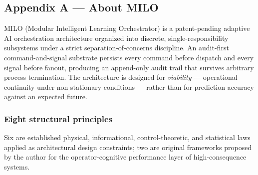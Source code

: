 \subsection{Appendix A --- About MILO}\label{appendix-a-about-milo}

MILO (Modular Intelligent Learning Orchestrator) is a patent-pending
adaptive AI orchestration architecture organized into discrete,
single-responsibility subsystems under a strict separation-of-concerns
discipline. An audit-first command-and-signal substrate persists every
command before dispatch and every signal before fanout, producing an
append-only audit trail that survives arbitrary process termination. The
architecture is designed for \emph{viability} --- operational continuity
under non-stationary conditions --- rather than for prediction accuracy
against an expected future.

\subsubsection{Eight structural
principles}\label{eight-structural-principles}

Six are established physical, informational, control-theoretic, and
statistical laws applied as architectural design constraints; two are
original frameworks proposed by the author for the operator-cognitive
performance layer of high-consequence systems.

